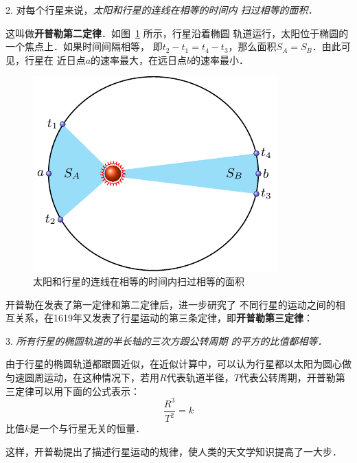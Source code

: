 2. 对每个行星来说，\textit{太阳和行星的连线在相等的时间内
扫过相等的面积．}

这叫做\textbf{开普勒第二定律}．如图~\ref{fig_A_5-2} 所示，行星沿着椭圆
轨道运行，太阳位于椭圆的一个焦点上．如果时间间隔相等，
即$t_2-t_1=t_4-t_3$，那么面积$S_A=S_B$．由此可见，行星在
近日点$a$的速率最大，在远日点$b$的速率最小．
\begin{figure}[htbp]
	\centering
	\includegraphics{fig/A/5-2.pdf}
	\caption{太阳和行星的连线在相等的时间内扫过相等的面积}\label{fig_A_5-2}
\end{figure}


开普勒在发表了第一定律和第二定律后，进一步研究了	
不同行星的运动之间的相互关系，在1619年又发表了行星运动的第三条定律，即\textbf{开普勒第三定律}：

3. \textit{所有行星的椭圆轨道的半长轴的三次方跟公转周期
的平方的比值都相等．}


由于行星的椭圆轨道都跟圆近似，在近似计算中，可以认为行星都以太阳为圆心做匀速圆周运动，在这种情况下，若用$R$代表轨道半径，$T$代表公转周期，开普勒第三定律可以用下面的公式表示：
\[\frac{R^3}{T^2}=k \]
比值$k$是一个与行星无关的恒量．

这样，开普勒提出了描述行星运动的规律，使人类的天文学知识提高了一大步．	
	
	
